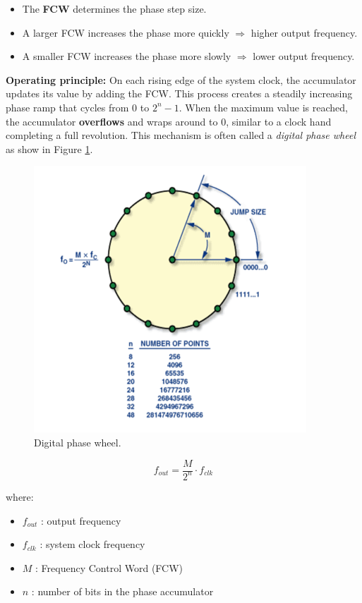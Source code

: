 \begin{itemize}[label=-]
	\item The \textbf{FCW} determines the phase step size.
	\item A larger FCW increases the phase more quickly $\Rightarrow$ higher output frequency.
	\item A smaller FCW increases the phase more slowly $\Rightarrow$ lower output frequency.
\end{itemize}

\noindent
\textbf{Operating principle:}  
On each rising edge of the system clock, the accumulator updates its value by adding the FCW. 
This process creates a steadily increasing phase ramp that cycles from $0$ to $2^n-1$. 
When the maximum value is reached, the accumulator \textbf{overflows} and wraps around to $0$, similar to a clock hand completing a full revolution. 
This mechanism is often called a \textit{digital phase wheel} as show in Figure \ref{fig: banh xe pha}.

\begin{figure}[H]
	\centering
	\includegraphics[width=.6\linewidth]{./my-chapters/my-images/Gen_wave/hinh1.png}
	\caption{Digital phase wheel.}
	\label{fig: banh xe pha}
\end{figure}

\[
f_{out} = \frac{M}{2^n} \cdot f_{clk}
\]

where:
\begin{itemize}[label=+]
	\item $f_{out}$ : output frequency
	\item $f_{clk}$ : system clock frequency
	\item $M$ : Frequency Control Word (FCW)
	\item $n$ : number of bits in the phase accumulator
\end{itemize}

